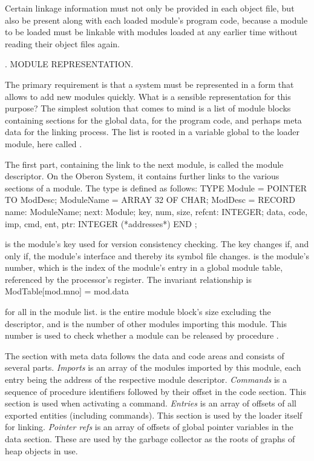 Certain linkage information must not only be provided in each object file, but also be present along with each loaded module's program code, because a module to be loaded must be linkable with modules loaded at any earlier time without reading their object files again.

. MODULE REPRESENTATION.

The primary requirement is that a system must be represented in a form that allows to add new modules quickly. What is a sensible representation for this purpose? The simplest solution that comes to mind is a list of module blocks containing sections for the global data, for the program code, and perhaps meta data for the linking process. The list is rooted in a variable global to the loader module, here called .


The first part, containing the link to the next module, is called the module descriptor. On the Oberon System, it contains further links to the various sections of a module. The type  is defined as follows:
\begintt
TYPE Module = POINTER TO ModDesc;
ModuleName = ARRAY 32 OF CHAR;
ModDesc = RECORD
  name: ModuleName;
  next: Module;
  key, num, size, refcnt: INTEGER;
  data, code, imp, cmd, ent, ptr: INTEGER (*addresses*)
END ;
\endtt

\noindent {} is the module's key used for version consistency checking. The key changes if, and only if, the module's interface and thereby its symbol file changes.  is the module's number, which is the index of the module's entry in a global module table, referenced by the processor's  register. The invariant relationship is
\begintt
ModTable[mod.mno] = mod.data
\endtt

\noindent for all  in the module list.  is the entire module block's size excluding the descriptor, and  is the number of other modules importing this module. This number is used to check whether a module can be released by procedure .


The section with meta data follows the data and code areas and consists of several parts. \emph{Imports} is an array of the modules imported by this module, each entry being the address of the respective module descriptor. \emph{Commands} is a sequence of procedure identifiers followed by their offset in the code section. This section is used when activating a command. \emph{Entries} is an array of offsets of all exported entities (including commands). This section is used by the loader itself for linking. \emph{Pointer refs} is an array of offsets of global pointer variables in the data section. These are used by the garbage collector as the roots of graphs of heap objects in use.

